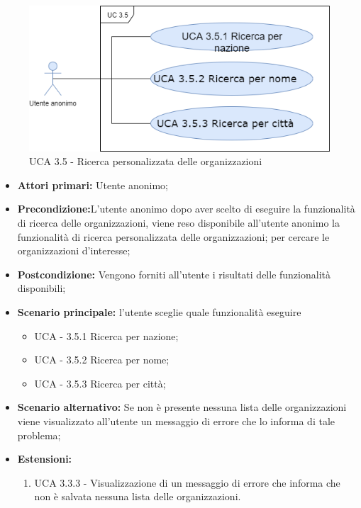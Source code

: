 \begin{figure}[h]
	\centering
	
	\includegraphics[scale=0.5]{sezioni/UseCase/Immagini/UCA3.5.png}
	\caption{UCA 3.5 - Ricerca personalizzata delle organizzazioni}
\end{figure}

\begin{itemize}
	\item \textbf{Attori primari:} Utente anonimo;
	\item \textbf{Precondizione:}L'utente anonimo dopo aver scelto di eseguire la funzionalità di ricerca delle organizzazioni, viene reso disponibile all'utente anonimo la funzionalità di ricerca personalizzata delle organizzazioni; per cercare le organizzazioni d'interesse;
	\item \textbf{Postcondizione:} Vengono forniti all'utente i risultati delle funzionalità disponibili;
	\item \textbf{Scenario principale:} l'utente sceglie quale funzionalità eseguire
	\begin{itemize}
		\item UCA - 3.5.1 Ricerca per nazione;
		\item UCA - 3.5.2 Ricerca per nome;
		\item UCA - 3.5.3 Ricerca per città;
	\end{itemize}
	\item \textbf{Scenario alternativo:} Se non è presente nessuna lista delle organizzazioni viene visualizzato all'utente un messaggio di errore che lo informa di tale problema;
	\item \textbf{Estensioni:}
	\begin{enumerate}
		\item UCA 3.3.3 - Visualizzazione di un messaggio di errore che informa che non è salvata nessuna lista delle organizzazioni.
	\end{enumerate}
\end{itemize}

